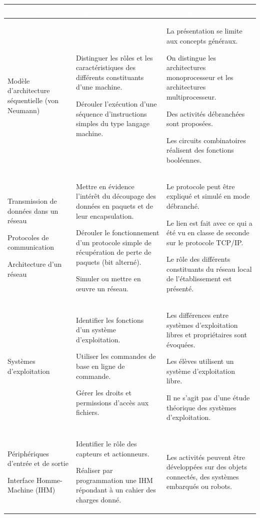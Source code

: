 {\centering\begin{tabular}{|L{3cm}|L{5.5cm}|L{6cm}|}\hline
{}\bfseries\textcolor{white}{Contenus}&
\bfseries\textcolor{white}{Capacités attendues}&
\bfseries\textcolor{white}{Commentaires}\\ \hline
Modèle d'architecture séquentielle (von Neumann)
&
Distinguer les rôles et les caractéristiques des différents constituants d'une machine.

Dérouler l'exécution d'une séquence d'instructions simples du type langage machine.
&
La présentation se limite aux concepts généraux.

On distingue les architectures monoprocesseur et les architectures multiprocesseur.

Des activités débranchées sont proposées.

Les circuits combinatoires réalisent des fonctions booléennes.\\ \hline
Transmission de données dans un réseau

Protocoles de communication

Architecture d'un réseau

&
Mettre en évidence l'intérêt du découpage des données en paquets et de leur encapsulation.

Dérouler le fonctionnement d'un protocole simple de récupération de perte de paquets (bit alterné).

Simuler ou mettre en œuvre un réseau.
&
Le protocole peut être expliqué et simulé en mode débranché.

Le lien est fait avec ce qui a été vu en classe de seconde sur le protocole TCP/IP.

Le rôle des différents constituants du réseau local de l'établissement est présenté.\\ \hline
Systèmes d'exploitation
&
Identifier les fonctions d'un système d'exploitation.

Utiliser les commandes de base en ligne de commande.

Gérer les droits et permissions d'accès aux fichiers.
&
Les différences entre systèmes d'exploitation libres et propriétaires sont évoquées.

Les élèves utilisent un système d'exploitation libre.

Il ne s'agit pas d'une étude théorique des systèmes d'exploitation.\\ \hline
Périphériques d'entrée et de sortie

Interface Homme-Machine (IHM)
&
Identifier le rôle des capteurs et actionneurs.

Réaliser par programmation une IHM répondant à un cahier des charges donné.
&
Les activités peuvent être développées sur des objets connectés, des systèmes embarqués ou robots.\\ \hline
\end{tabular}\par}


